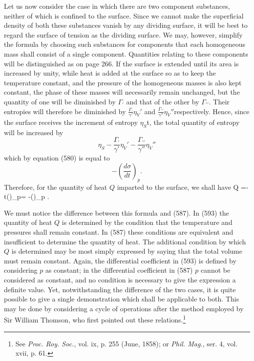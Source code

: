 \documentclass[12pt]{memoir}
\begin{document}
{Let us now consider the case in which there are two component substances, neither of which is confined to the surface. Since we cannot make the superficial density of both these substances vanish by any dividing surface, it will be best to regard the surface of tension as the dividing surface. We may, however, simplify the formula by choosing such substances for components that each homogeneous mass shall consist of a single component. Quantities relating to these components will be distinguished as on page 266. If the surface is extended until its area is increased by unity, while heat is added at the surface so as to keep the temperature constant, and the pressure of the homogeneous masses is also kept constant, the phase of these masses will necessarily remain unchanged, but the quantity of one will be diminished by $\Gamma_\prime$ and that of the other by $\Gamma_{\prime\prime}$. Their entropies will therefore be diminished by $\frac{\Gamma_\prime}{\gamma'}\eta_V'$  and $\frac{\Gamma_{\prime\prime}}{\gamma''}\eta_V''$respectively. Hence, since the surface receives the increment of entropy $\eta_S$t, the total quantity of entropy will be increased by
$$\eta_S - \frac{\Gamma_\prime}{\gamma'}\eta_V'- \frac{\Gamma_{\prime\prime}}{\gamma''}\eta_V''$$
which by equation (580) is equal to
$$-\left(\frac{d\sigma}{dt}\right)_p.$$
Therefore, for the quantity of heat $Q$ imparted to the surface, we shall have
\eqs Q =-t\left(\right)_p= -\left(\right)_p . \label{593} \eqe

We must notice the difference between this formula and (587). In (593) the quantity of heat $Q$ is determined by the condition that the temperature and pressures shall remain constant. In (587) these conditions are equivalent and insufficient to determine the quantity of heat. The additional condition by which $Q$ is determined may be most simply expressed by saying that the total volume must remain constant. Again, the differential coefficient in (593) is defined by considering $p$ as constant; in the differential coefficient in (587) $p$ cannot be considered as constant, and no condition is necessary to give the expression a definite value. Yet, notwithstanding the difference of the two cases, it is quite possible to give a single demonstration which shall be applicable to both. This may be done by considering a cycle of operations after the method employed by Sir William Thomson, who first pointed out these relations.\footnote{See \textit{Proc. Roy. Soc.}, vol. ix, p. 255 (June, 1858); or \textit{Phil. Mag.}, ser. 4, vol. xvii, p. 61.}

}
\end{document}
